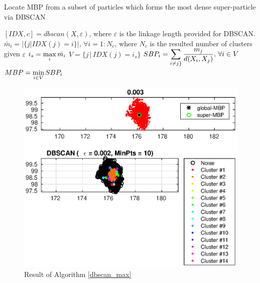 \documentclass[10pt]{article}
\begin{document}
 \begin{algorithm}
\caption{Locate MBP from a subset of particles which forms the most dense super-particle via DBSCAN}
\label{dbscan_max}
\begin{algorithmic}[1]
\State $[IDX,c]=dbscan(X,\varepsilon)$, where $\varepsilon$ is the linkage length provided for DBSCAN. 
\State $\bar m_i=|\{j | IDX(j)=i\}|,\,\forall i=1:N_c$, where $N_c$ is the resulted number of clusters given $\varepsilon$
\State $i_s=\displaystyle\max_i \bar{m_i}$
\State $V=\{j \,|\, IDX(j)=i_s\}$
\State $SBP_i=\displaystyle\sum_{i\neq j\}}\frac{m_j}{d(X_i,X_j)},\, \forall i\in V$ 
\State $MBP=\displaystyle\min_{i\in V} SBP_i$
\EndProcedure
\end{algorithmic} 
 \end{algorithm}
\begin{figure}[H]
\centering
\includegraphics[scale=0.45]{p_dbscan_maxSub}%
\caption{Result of Algorithm \ref{dbscan_max}}
\label{fig:dbscan_max}
\end{figure}
\end{document}
